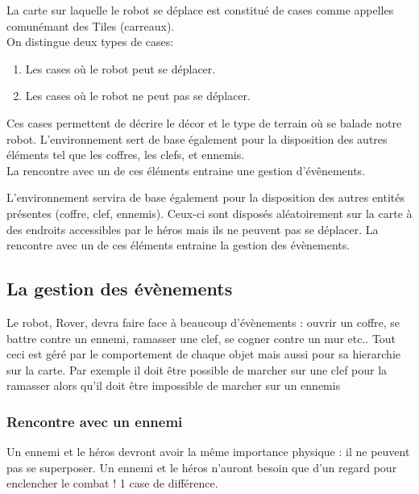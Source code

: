 \documentclass[a4paper 12pts]{article}
\begin{document}
\vspace{0.75cm}

La carte sur laquelle le robot se déplace est constitué de cases comme appelles comunémant des Tiles (carreaux). \\
On distingue deux types de cases:

\begin{enumerate}
	\item Les cases où le robot peut se déplacer.
	\item Les cases où le robot ne peut pas se déplacer.
\end{enumerate}

Ces cases permettent de décrire le décor et le type de terrain où se balade notre robot.
L'environnement sert de base également pour la disposition des autres éléments tel que les coffres, les clefs, et ennemis.\\
La rencontre avec un de ces éléments entraine une gestion d'évênements.

L'environnement servira de base également pour la disposition des autres entités présentes (coffre, clef, ennemis).
Ceux-ci sont disposés aléatoirement sur la carte à des endroits accessibles par le héros mais ils ne peuvent pas se déplacer.
La rencontre avec un de ces éléments entraine la gestion des évènements.



\vspace{0.75cm}

\subsection{La gestion des évènements}

Le robot, Rover, devra faire face à beaucoup d'évènements : ouvrir un coffre, se battre contre un ennemi, ramasser une clef, se cogner contre un mur etc..
Tout ceci est géré par le comportement de chaque objet mais aussi pour sa hierarchie sur la carte.
Par exemple il doit être possible de marcher sur une clef pour la ramasser alors qu'il doit être impossible de marcher sur un ennemis

\subsubsection {Rencontre avec un ennemi} 
Un ennemi et le héros devront avoir la même importance physique : il ne peuvent pas se superposer.
Un ennemi et le héros n'auront besoin que d'un regard pour enclencher le combat ! 1 case de différence.
\end{document}
